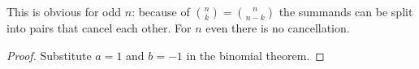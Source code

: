 

\setcounter{section}{3}
\setcounter{subsection}{5}
\setcounter{dfn}{8}

This is obvious for odd $n$: because of $\binom{n}{k} = \binom{n}{n-k}$ the summands can be split into pairs that cancel each other.
For $n$ even there is no cancellation.
\begin{proof}
Substitute $a=1$ and $b=-1$ in the binomial theorem.
\end{proof}




